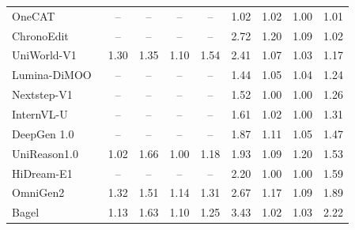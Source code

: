 \begin{table}[t]
{\begin{tabular}{l|cccc|cccc}
            \midrule

            OneCAT~\cite{li2025onecat}
            & -- & -- & -- & --
            & 1.02 & 1.02 & 1.00
            & \cellcolor[HTML]{C8C8C8}1.01 \\

            ChronoEdit~\cite{wu2025chronoedit}
            & -- & -- & -- & --
            & 2.72 & 1.20 & 1.09
            & \cellcolor[HTML]{C8C8C8}1.02 \\

            UniWorld-V1~\cite{lin2025uniworld}
            & 1.30 & 1.35 & 1.10 & \cellcolor[HTML]{C8C8C8}1.54 & 2.41 & 1.07 & 1.03
            & \cellcolor[HTML]{C8C8C8}1.17 \\

            Lumina-DiMOO~\cite{xin2025lumina}
            & -- & -- & -- & --
            & 1.44 & 1.05 & 1.04
            & \cellcolor[HTML]{C8C8C8}1.24 \\

            
            Nextstep-V1~\cite{han2025nextstep}
            & -- & -- & -- & --
            & 1.52 & 1.00 & 1.00
            & \cellcolor[HTML]{C8C8C8}1.26 \\

            InternVL-U~\cite{tian2026internvl}
            & -- & -- & -- & --
            & 1.61 & 1.02 & 1.00
            & \cellcolor[HTML]{C8C8C8}1.31 \\

            DeepGen 1.0~\cite{wang2026deepgen}
            & -- & -- & -- & --
            & 1.87 & 1.11 & 1.05
            & \cellcolor[HTML]{C8C8C8}1.47 \\

            UniReason1.0~\cite{wang2026unireason}
            & 1.02 & 1.66 & 1.00 & \cellcolor[HTML]{C8C8C8}1.18 & 1.93 & 1.09 & 1.20
            & \cellcolor[HTML]{C8C8C8}1.53 \\

            HiDream-E1~\cite{cai2025hidream}
            & -- & -- & -- & --
            & 2.20 & 1.00 & 1.00
            & \cellcolor[HTML]{C8C8C8}1.59 \\

            OmniGen2~\cite{wu2025omnigen2}
            & 1.32 & 1.51 & 1.14 & \cellcolor[HTML]{C8C8C8}1.31 & 2.67 & 1.17 & 1.09 
            & \cellcolor[HTML]{C8C8C8}1.89 \\

            Bagel~\cite{deng2025emerging}
            & 1.13 & 1.63 & 1.10 & \cellcolor[HTML]{C8C8C8}1.25 & 3.43 & 1.02 & 1.03
            & \cellcolor[HTML]{C8C8C8}2.22 \\


\end{tabular}}
\end{table}
